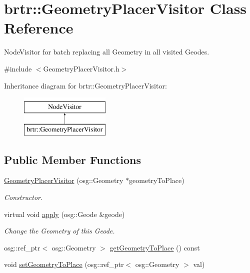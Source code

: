 \hypertarget{classbrtr_1_1_geometry_placer_visitor}{\section{brtr\+:\+:Geometry\+Placer\+Visitor Class Reference}
\label{classbrtr_1_1_geometry_placer_visitor}
}


Node\+Visitor for batch replacing all Geometry in all visited Geodes.  




{\ttfamily \#include $<$Geometry\+Placer\+Visitor.\+h$>$}

Inheritance diagram for brtr\+:\+:Geometry\+Placer\+Visitor\+:\begin{figure}[H]
\begin{center}
\leavevmode
\includegraphics[height=2.000000cm]{classbrtr_1_1_geometry_placer_visitor}
\end{center}
\end{figure}
\subsection*{Public Member Functions}
\begin{DoxyCompactItemize}
\item 
\hyperlink{classbrtr_1_1_geometry_placer_visitor_a5e6ca74eba57f86c0916434cb38eb7fc}{Geometry\+Placer\+Visitor} (osg\+::\+Geometry $\ast$geometry\+To\+Place)
\begin{DoxyCompactList}\small\item\em Constructor. \end{DoxyCompactList}\item 
virtual void \hyperlink{classbrtr_1_1_geometry_placer_visitor_a26089587464d88953e38926162cb1c6e}{apply} (osg\+::\+Geode \&geode)
\begin{DoxyCompactList}\small\item\em Change the Geometry of this Geode. \end{DoxyCompactList}\item 
osg\+::ref\+\_\+ptr$<$ osg\+::\+Geometry $>$ \hyperlink{classbrtr_1_1_geometry_placer_visitor_ad784364cfe34434dc2183a5ead95db40}{get\+Geometry\+To\+Place} () const 
\item 
void \hyperlink{classbrtr_1_1_geometry_placer_visitor_a95e8e5c2df5b9a31949c55c796c90fd5}{set\+Geometry\+To\+Place} (osg\+::ref\+\_\+ptr$<$ osg\+::\+Geometry $>$ val)
\end{DoxyCompactItemize}
